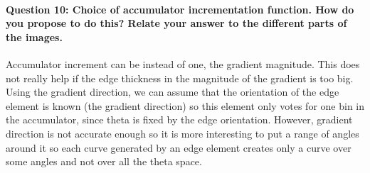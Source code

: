 \documentclass[12pt]{article}
\begin{document}
\paragraph{Question 10: Choice of accumulator incrementation function. How do you propose to do this? Relate your answer to the different parts of the images.}
Accumulator increment can be instead of one, the gradient magnitude. This does not really help if the edge thickness in the magnitude of the gradient is too big. Using the gradient direction, we can assume that the orientation of the edge element is known (the gradient direction) so this element only votes for one bin in the accumulator, since theta is fixed by the edge orientation. However, gradient direction is not accurate enough so it is more interesting to put a range of angles around it so each curve generated by an edge element creates only a curve over some angles and not over all the theta space.
\end{document}
